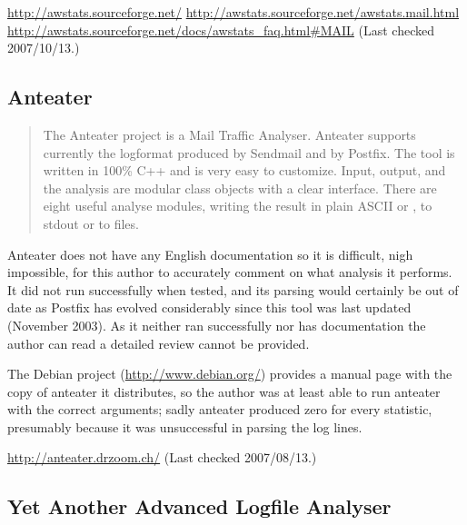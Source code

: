 
\noindent\url{http://awstats.sourceforge.net/} \newline
\url{http://awstats.sourceforge.net/awstats.mail.html} \newline
\url{http://awstats.sourceforge.net/docs/awstats_faq.html#MAIL}
\newline (Last checked 2007/10/13.)

\subsection{Anteater}

\begin{quotation}

    The Anteater project is a Mail Traffic Analyser. Anteater supports
    currently the logformat produced by Sendmail and by Postfix. The tool
    is written in 100\% C++ and is very easy to customize. Input, output,
    and the analysis are modular class objects with a clear interface.
    There are eight useful analyse modules, writing the result in plain
    ASCII or \HTML{}, to stdout or to files.

\end{quotation}

Anteater does not have any English documentation so it is difficult, nigh
impossible, for this author to accurately comment on what analysis it
performs.  It did not run successfully when tested, and its parsing would
certainly be out of date as Postfix has evolved considerably since this
tool was last updated (November 2003).  As it neither ran successfully nor
has documentation the author can read a detailed review cannot be provided.

The Debian project (\url{http://www.debian.org/}) provides a manual page
with the copy of anteater it distributes, so the author was at least able
to run anteater with the correct arguments; sadly anteater produced zero
for every statistic, presumably because it was unsuccessful in parsing the
log lines.

\url{http://anteater.drzoom.ch/} \newline (Last checked 2007/08/13.)

\subsection{Yet Another Advanced Logfile Analyser}

